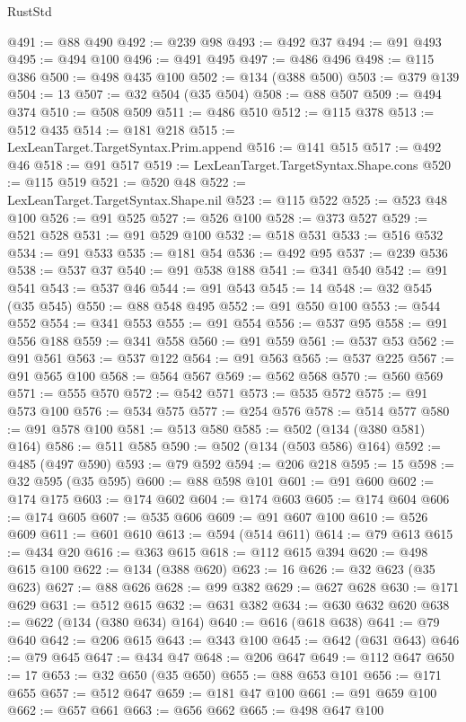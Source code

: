 \begin{lexlean}{RustStd}
\begin{coremodule}
{\begin{coremodule}
{{{{{{{{{{{{{{{{{{{{{{{{{{{{{{{{@491 := @88 @490
@492 := @239 @98
@493 := @492 @37
@494 := @91 @493
@495 := @494 @100
@496 := @491 @495
@497 := @486 @496
@498 := @115 @386
@500 := @498 @435 @100
@502 := @134 (@388 @500)
@503 := @379 @139
@504 := 13
@507 := @32 @504 (@35 @504)
@508 := @88 @507
@509 := @494 @374
@510 := @508 @509
@511 := @486 @510
@512 := @115 @378
@513 := @512 @435
@514 := @181 @218
@515 := LexLeanTarget.TargetSyntax.Prim.append
@516 := @141 @515
@517 := @492 @46
@518 := @91 @517
@519 := LexLeanTarget.TargetSyntax.Shape.cons
@520 := @115 @519
@521 := @520 @48
@522 := LexLeanTarget.TargetSyntax.Shape.nil
@523 := @115 @522
@525 := @523 @48 @100
@526 := @91 @525
@527 := @526 @100
@528 := @373 @527
@529 := @521 @528
@531 := @91 @529 @100
@532 := @518 @531
@533 := @516 @532
@534 := @91 @533
@535 := @181 @54
@536 := @492 @95
@537 := @239 @536
@538 := @537 @37
@540 := @91 @538 @188
@541 := @341 @540
@542 := @91 @541
@543 := @537 @46
@544 := @91 @543
@545 := 14
@548 := @32 @545 (@35 @545)
@550 := @88 @548 @495
@552 := @91 @550 @100
@553 := @544 @552
@554 := @341 @553
@555 := @91 @554
@556 := @537 @95
@558 := @91 @556 @188
@559 := @341 @558
@560 := @91 @559
@561 := @537 @53
@562 := @91 @561
@563 := @537 @122
@564 := @91 @563
@565 := @537 @225
@567 := @91 @565 @100
@568 := @564 @567
@569 := @562 @568
@570 := @560 @569
@571 := @555 @570
@572 := @542 @571
@573 := @535 @572
@575 := @91 @573 @100
@576 := @534 @575
@577 := @254 @576
@578 := @514 @577
@580 := @91 @578 @100
@581 := @513 @580
@585 := @502 (@134 (@380 @581) @164)
@586 := @511 @585
@590 := @502 (@134 (@503 @586) @164)
@592 := @485 (@497 @590)
@593 := @79 @592
@594 := @206 @218
@595 := 15
@598 := @32 @595 (@35 @595)
@600 := @88 @598 @101
@601 := @91 @600
@602 := @174 @175
@603 := @174 @602
@604 := @174 @603
@605 := @174 @604
@606 := @174 @605
@607 := @535 @606
@609 := @91 @607 @100
@610 := @526 @609
@611 := @601 @610
@613 := @594 (@514 @611)
@614 := @79 @613
@615 := @434 @20
@616 := @363 @615
@618 := @112 @615 @394
@620 := @498 @615 @100
@622 := @134 (@388 @620)
@623 := 16
@626 := @32 @623 (@35 @623)
@627 := @88 @626
@628 := @99 @382
@629 := @627 @628
@630 := @171 @629
@631 := @512 @615
@632 := @631 @382
@634 := @630 @632 @620
@638 := @622 (@134 (@380 @634) @164)
@640 := @616 (@618 @638)
@641 := @79 @640
@642 := @206 @615
@643 := @343 @100
@645 := @642 (@631 @643)
@646 := @79 @645
@647 := @434 @47
@648 := @206 @647
@649 := @112 @647
@650 := 17
@653 := @32 @650 (@35 @650)
@655 := @88 @653 @101
@656 := @171 @655
@657 := @512 @647
@659 := @181 @47 @100
@661 := @91 @659 @100
@662 := @657 @661
@663 := @656 @662
@665 := @498 @647 @100
}}}}}}}}}}}}}}}}}}}}}}}}}}}}}}}}
\end{coremodule}}
\end{coremodule}
\end{lexlean}

